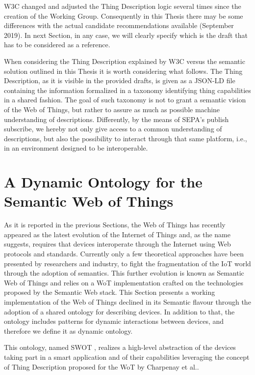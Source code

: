 W3C changed and adjusted the Thing Description logic several times since the creation of the Working Group. Consequently in this Thesis there may be some differences with the actual candidate recommendations available (September 2019). In next Section, in any case, we will clearly specify which is the draft that has to be considered as a reference. 

When considering the Thing Description explained by W3C versus the semantic solution outlined in this Thesis it is worth considering what follows. The Thing Description, as it is visible in the provided drafts, is given as a JSON-LD file containing the information formalized in a taxonomy identifying thing capabilities in a shared fashion. The goal of such taxonomy is not to grant a semantic vision of the Web of Things, but rather to assure as much as possible machine understanding of descriptions. Differently, by the means of SEPA's publish subscribe, we hereby not only give access to a common understanding of descriptions, but also the possibility to interact through that same platform, i.e., in an environment designed to be interoperable.

\section{A Dynamic Ontology for the Semantic Web of Things}
\label{sec:swot_ontology}
As it is reported in the previous Sections, the Web of Things has recently appeared as the latest evolution of the Internet of Things and, as the name suggests, requires that devices interoperate through the Internet using Web protocols and standards. Currently only a few theoretical approaches have been presented by researchers and industry, to fight the fragmentation of the IoT world through the adoption of semantics. This further evolution is known as Semantic Web of Things and relies on a WoT implementation crafted on the technologies proposed by the Semantic Web stack. This Section presents a working implementation of the Web of Things declined in its Semantic flavour through the adoption of a shared ontology for describing devices. In addition to that, the ontology includes patterns for dynamic interactions between devices, and therefore we define it as dynamic ontology.

This ontology, named SWOT , realizes a high-level abstraction of the devices taking part in a smart application and of their capabilities leveraging the concept of Thing Description proposed for the WoT by Charpenay et al.\cite{charpenay2016introducing}. 

